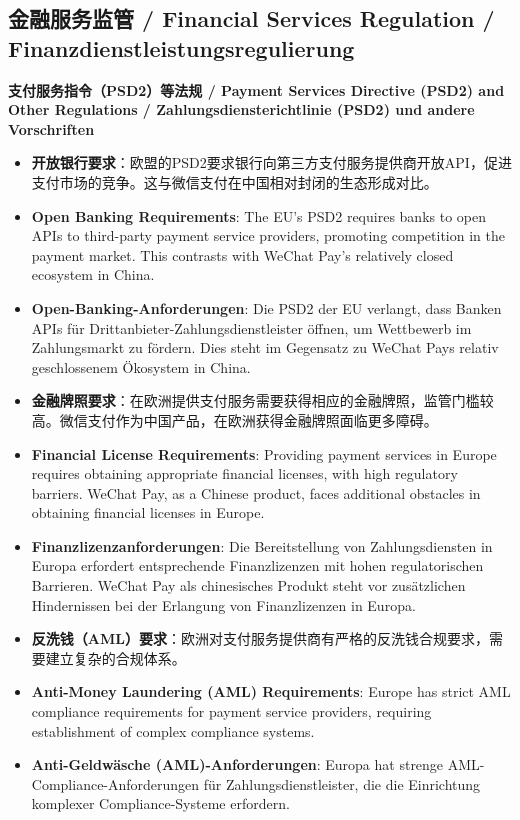 \documentclass[11pt,a4paper]{article}
\begin{document}
\subsection{金融服务监管 / Financial Services Regulation / Finanzdienstleistungsregulierung}

\textbf{支付服务指令（PSD2）等法规 / Payment Services Directive (PSD2) and Other Regulations / Zahlungsdiensterichtlinie (PSD2) und andere Vorschriften}

\begin{itemize}
    \item \textbf{开放银行要求}：欧盟的PSD2要求银行向第三方支付服务提供商开放API，促进支付市场的竞争。这与微信支付在中国相对封闭的生态形成对比。
    \item \textbf{Open Banking Requirements}: The EU's PSD2 requires banks to open APIs to third-party payment service providers, promoting competition in the payment market. This contrasts with WeChat Pay's relatively closed ecosystem in China.
    \item \textbf{Open-Banking-Anforderungen}: Die PSD2 der EU verlangt, dass Banken APIs für Drittanbieter-Zahlungsdienstleister öffnen, um Wettbewerb im Zahlungsmarkt zu fördern. Dies steht im Gegensatz zu WeChat Pays relativ geschlossenem Ökosystem in China.
    
    \item \textbf{金融牌照要求}：在欧洲提供支付服务需要获得相应的金融牌照，监管门槛较高。微信支付作为中国产品，在欧洲获得金融牌照面临更多障碍。
    \item \textbf{Financial License Requirements}: Providing payment services in Europe requires obtaining appropriate financial licenses, with high regulatory barriers. WeChat Pay, as a Chinese product, faces additional obstacles in obtaining financial licenses in Europe.
    \item \textbf{Finanzlizenzanforderungen}: Die Bereitstellung von Zahlungsdiensten in Europa erfordert entsprechende Finanzlizenzen mit hohen regulatorischen Barrieren. WeChat Pay als chinesisches Produkt steht vor zusätzlichen Hindernissen bei der Erlangung von Finanzlizenzen in Europa.
    
    \item \textbf{反洗钱（AML）要求}：欧洲对支付服务提供商有严格的反洗钱合规要求，需要建立复杂的合规体系。
    \item \textbf{Anti-Money Laundering (AML) Requirements}: Europe has strict AML compliance requirements for payment service providers, requiring establishment of complex compliance systems.
    \item \textbf{Anti-Geldwäsche (AML)-Anforderungen}: Europa hat strenge AML-Compliance-Anforderungen für Zahlungsdienstleister, die die Einrichtung komplexer Compliance-Systeme erfordern.
\end{itemize}
\end{document}
